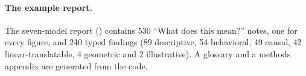 \paragraph{The example report.} The seven-model report () contains 530
``What does this mean?'' notes, one for every figure, and 240 typed findings (89 descriptive, 54 behavioral, 49 causal,
42 linear-translatable, 4 geometric and 2 illustrative). A glossary and a methods appendix are generated from the code.
